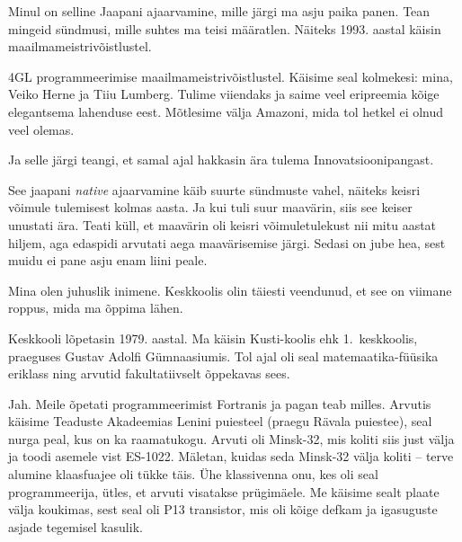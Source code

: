 

Minul on selline Jaapani ajaarvamine, mille järgi ma asju paika panen. Tean
mingeid sündmusi, mille suhtes ma teisi määratlen. Näiteks 
1993. aastal käisin maailmameistrivõistlustel. 


4GL 
programmeerimise maailmameistrivõistlustel. Käisime seal kolmekesi: mina, Veiko 
Herne ja Tiiu Lumberg. 
Tulime viiendaks ja saime veel eripreemia kõige elegantsema lahenduse eest. 
Mõtlesime välja Amazoni, mida tol hetkel ei olnud veel olemas. 

Ja selle järgi teangi, et samal ajal hakkasin ära tulema 
Innovatsioonipangast. 

See jaapani \emph{native} ajaarvamine käib suurte sündmuste vahel, näiteks 
keisri võimule tulemisest kolmas aasta. Ja kui tuli suur maavärin, siis 
see keiser unustati ära. Teati küll, et maavärin oli keisri võimuletulekust nii mitu aastat hiljem, aga edaspidi arvutati aega maavärisemise järgi. 
Sedasi on jube hea, sest muidu ei pane asju enam liini peale. 


Mina olen juhuslik inimene. Keskkoolis olin 
täiesti veendunud, et see on viimane roppus, mida ma õppima lähen. 


Keskkooli lõpetasin 1979. aastal. Ma käisin Kusti-koolis ehk \mbox{1.
keskkoolis}, praeguses Gustav Adolfi Gümnaasiumis. Tol 
ajal oli seal matemaatika-füüsika eriklass ning arvutid fakultatiivselt õppekavas sees. 


Jah. Meile õpetati programmeerimist Fortranis ja pagan 
teab milles. Arvutis käisime Teaduste Akadeemias 
Lenini puiesteel (praegu Rävala puiestee), seal nurga peal, kus on ka
raamatukogu. Arvuti oli Minsk-32, mis 
koliti siis just välja ja toodi asemele vist ES-1022. Mäletan, kuidas seda Minsk-32 välja koliti -- terve alumine klaasfuajee oli 
tükke täis. Ühe klassivenna onu, kes oli seal programmeerija, ütles, et 
arvuti visatakse prügimäele. Me käisime sealt plaate välja koukimas, sest 
seal oli P13 transistor, mis oli kõige defkam 
ja igasuguste asjade tegemisel kasulik.


